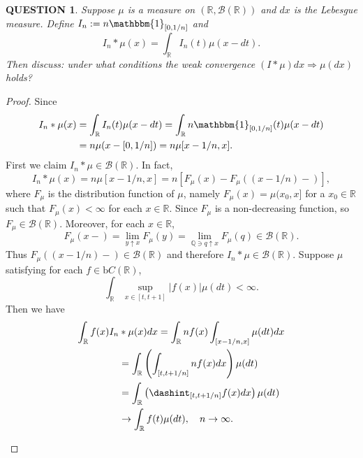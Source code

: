 \documentclass[12pt]{article}
\renewcommand{\b}{\mathscr{B}}
\renewcommand{\(}{\left(}%
\renewcommand{\)}{\right)}%
\renewcommand{\[}{\left[}%
\renewcommand{\]}{\right]}%
\renewcommand{\r}{\mathbb{R}}
\newcommand{\q}{\mathbb{Q}}
\newtheorem{question}{QUESTION}[section]}
\newtheorem{proof}{Proof.}}
\begin{document}
  \begin{question}
   Suppose $\mu$ is a measure on $(\r,\b(\r))$ and $dx$ is the Lebesgue measure. Define $I_n:=n\mathbbm{1}_{[0,1/n]}$ and
   \begin{equation*}
    I_n*\mu(x)=\int_\r I_n(t)\mu(x-dt).
   \end{equation*}
   Then discuss: under what conditions the weak convergence $(I*\mu)dx\Rightarrow \mu(dx)$ holds?
  \end{question}
  \begin{proof}
   Since
   \begin{equation*}
    \begin{split}
     I_n*\mu(x)&=\int_\r I_n(t)\mu(x-dt)=\int_\r n\mathbbm{1}_{[0,1/n ]}(t)\mu(x-dt)\\
     &=n\mu(x-[0,1/n])=n\mu[x-1/n,x ].
    \end{split}
   \end{equation*}
   First we claim $I_n*\mu\in\b(\r)$. In fact,
   \begin{equation*}
    I_n*\mu(x)=n\mu[x-1/n,x ]=n\[F_\mu(x)-F_\mu((x-1/n)-) \],
   \end{equation*}
   where $F_\mu$ is the distribution function of $\mu$, namely $F_\mu(x)=\mu(x_0,x]$ for a $x_0\in\r$ such that $F_\mu(x)<\infty $ for each $x\in\r$. Since $F_\mu$ is a non-decreasing function, so $F_\mu\in \b(\r)$. Moreover, for each $x\in\r$,
   \begin{equation*}
    F_\mu(x-)=\lim_{y\uparrow x}F_\mu(y)=\lim_{\q\ni q\uparrow x}F_\mu(q) \in\b(\r).
   \end{equation*}
   Thus $F_\mu((x-1/n)-)\in\b(\r)$ and therefore $I_n*\mu\in\b(\r)$.
   \sffamily Suppose $\mu$ satisfying for each $f\in\mathrm{b}C(\r)$,
   \begin{equation*}
     \int_{\r}\sup_{x\in[t,t+1]}|f(x)|\mu(dt)<\infty.
   \end{equation*}
   Then
   we have
   \begin{equation*}
    \begin{split}
     \int_\r f(x)I_n&*\mu(x)dx=\int_\r nf(x)\int_{[x-1/n,x ]}\mu(dt)dx\\
     &=\int_\r\(\int_{[t,t+1/n]}nf(x)dx\)\mu(dt)\\
     &=\int_\r\(\dashint_{[t,t+1/n]}f(x)dx\)\mu(dt)\\
     &\to \int_\r f(t)\mu(dt),\quad n\to\infty.
    \end{split}
   \end{equation*}
   \begin{enumerate}

\end{enumerate}
\end{proof}
\end{document}
